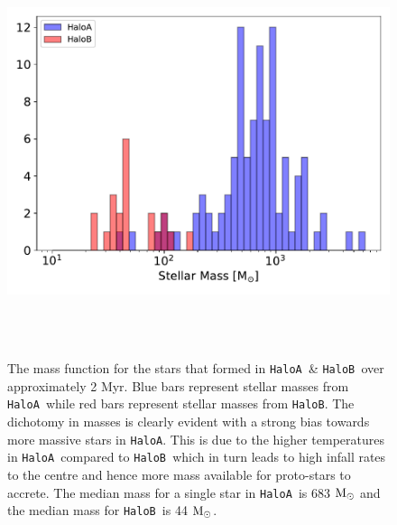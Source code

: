 \documentclass[twocolumn,iop,revtex4]{openjournal}
\newcommand{\msolar} {$\rm{M_{\odot}}~$}
\newcommand{\msolarc} {$\rm{M_{\odot}}$}
\newcommand{\ha} {\texttt{HaloA~}}
\newcommand{\hb} {\texttt{HaloB~}}
\newcommand{\hac} {\texttt{HaloA}}
\newcommand{\hbc} {\texttt{HaloB}}
\begin{document}
 
\begin{figure}
\centering
\begin{minipage}{175mm}      \begin{center}
\centerline{
    \includegraphics[width=18.0cm, height=12cm]{FIGURES/FinalMass_MultipleHaloes.pdf}}
\caption{
  The mass function for the stars that formed in \ha \& \hb over approximately 2 Myr.
  Blue bars represent stellar masses from \ha while red bars represent stellar masses from \hbc.
  The dichotomy in masses is clearly evident with a strong bias towards more massive stars
  in \hac. This is due to the higher temperatures in \ha compared to \hb which in turn
  leads to high infall rates to the centre and hence more mass available for proto-stars
  to accrete. The median mass for a single star in \ha is 683 \msolar and the median mass
  for \hb is 44 \msolarc. 
}
\label{Fig:MassFunction}
\end{center} \end{minipage}
\end{figure}
\end{document}
